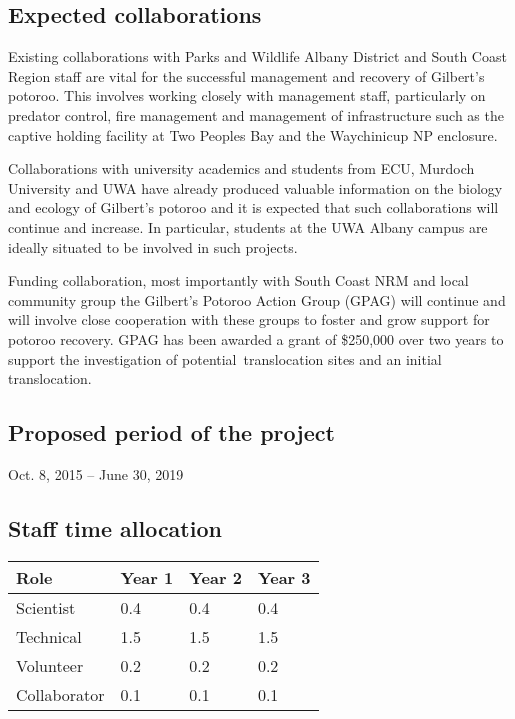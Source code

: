 \documentclass[version=last,
    paper=a4,                               %
    10pt,                                   %
    dvipsnames,
    oneside,                              %
    headings=openany,                       %
    open=any,
    BCOR=7mm,                               %
    DIV=15,     %
]{scrbook}
\begin{document}
\subsection*{Expected collaborations}

Existing collaborations with Parks and Wildlife Albany District and
South Coast Region staff are vital for the successful management and
recovery of Gilbert's potoroo. This involves working closely with
management staff, particularly on predator control, fire management and
management of infrastructure such as the captive holding facility at Two
Peoples Bay and the Waychinicup NP enclosure.

Collaborations with university academics and students from ECU, Murdoch
University and UWA have already produced valuable information on the
biology and ecology of Gilbert's potoroo and it is expected that such
collaborations will continue and increase. In particular, students at
the UWA Albany campus are ideally situated to be involved in such
projects.

Funding collaboration, most importantly with South Coast NRM and local
community group the Gilbert's Potoroo Action Group (GPAG) will continue
and will involve close cooperation with these groups to foster and grow
support for potoroo recovery. GPAG has been awarded a grant of \$250,000
over two years to support the investigation of potential~translocation
sites and an initial translocation.


\subsection*{Proposed period of the project}
Oct. 8, 2015 -- June 30, 2019



\subsection*{Staff time allocation }



\begin{longtabu} to \linewidth { |  X | X | X | X | }
\hline
{}
Role & Year 1 & Year 2 & Year 3\\
\hline
\endhead



Scientist & 0.4 & 0.4 & 0.4\\



Technical & 1.5 & 1.5 & 1.5\\



Volunteer & 0.2 & 0.2 & 0.2\\



Collaborator & 0.1 & 0.1 & 0.1\\


\hline
\end{longtabu}
\end{document}

